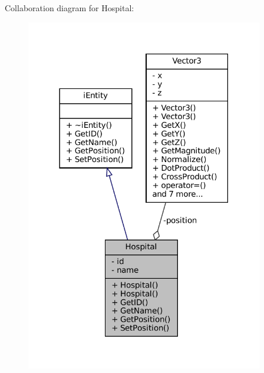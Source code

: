 Collaboration diagram for Hospital\+:\nopagebreak
\begin{figure}[H]
\begin{center}
\leavevmode
\includegraphics[width=294pt]{classHospital__coll__graph}
\end{center}
\end{figure}
